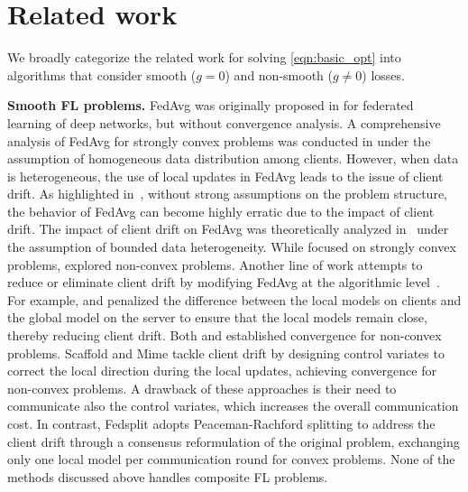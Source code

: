 \section{Related work}
We broadly categorize the related work for solving \eqref{eqn:basic_opt} into algorithms that consider smooth ($g=0$) and non-smooth ($g\neq 0$) losses.

{\bf  Smooth FL problems. }
FedAvg was originally proposed in \cite{mcmahan2017communication} for federated
learning of deep networks, but without convergence analysis. A comprehensive analysis of FedAvg for strongly convex problems was conducted in \cite{stich2018local} under the assumption of homogeneous data distribution among clients. %
However, when data is heterogeneous, the use of local updates in FedAvg leads to the issue of client drift. As highlighted in~\cite{zhang2021fedpd}, without strong assumptions on the problem structure, the behavior of FedAvg can become highly erratic due to the impact of client drift. 
The impact of client drift on FedAvg was theoretically analyzed in~\cite{li2019convergence,zhang2021fedpd} under the assumption of bounded data heterogeneity. While \cite{li2019convergence} focused on strongly convex problems,  \cite{zhang2021fedpd} explored non-convex problems. 
%
Another line of work attempts to reduce or eliminate client drift by modifying FedAvg at the algorithmic level~\cite{li2020federated-fedprox,c1, karimireddy2020scaffold,pathak2020fedsplit,karimireddy2020mime}.  
% 
{For example, \cite{li2020federated-fedprox} and \cite{c1} penalized the difference between the local models on clients and the global model on the server to ensure that the local models remain close, thereby reducing client drift. Both \cite{li2020federated-fedprox} and \cite{c1} established convergence for non-convex problems.} Scaffold \cite{karimireddy2020scaffold} and Mime \cite{karimireddy2020mime} tackle client drift by designing control variates to correct the local direction during the local updates, achieving convergence for non-convex problems.  
%
A drawback of these approaches is their need to communicate also the control variates, which increases the overall communication cost.  
%
In contrast, Fedsplit \cite{pathak2020fedsplit} adopts Peaceman-Rachford splitting \cite{he2014strictly} to address the client drift through a consensus reformulation of the original problem, exchanging only one local model per communication round for convex problems.
%
None of the methods discussed above handles composite FL problems.


